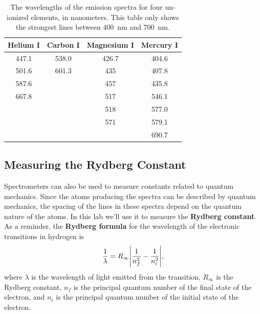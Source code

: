 \documentclass[]{manual}
\begin{document}
	\begin{table}[H]
		\centering
		\begin{tabular}{c|c|c|c}
			Helium I & Carbon I & Magnesium I & Mercury I \\
			\hline
			447.1 & 538.0 & 426.7 & 404.6 \\
			501.6 & 601.3 & 435   & 407.8 \\
			587.6 &       & 457   & 435.8 \\
			667.8 &       & 517   & 546.1 \\
                  &       & 518   & 577.0 \\
                  &       & 571   & 579.1 \\
                  &       &       & 690.7
		\end{tabular}
		\caption{
            The wavelengths of the emission spectra for four un-ionized elements, in nanometers.
		    This table only shows the strongest lines between \SI{400}{\nano\meter} and \SI{700}{\nano\meter}.
        }
		\label{table:emission-spectra}
	\end{table}


    \subsection{Measuring the Rydberg Constant}

    Spectrometers can also be used to measure constants related to quantum mechanics.
    Since the atoms producing the spectra can be described by quantum mechanics, the spacing of the lines in these spectra depend on the quantum nature of the atoms.
    In this lab we'll use it to measure the \textbf{Rydberg constant}.
    As a reminder, the \textbf{Rydberg formula} for the wavelength of the electronic transitions in hydrogen is
    \begin{align}
        \frac{1}{\lambda} = R_{\infty} \abs{\frac{1}{n_f^2}-\frac{1}{n_i^2}},
    \end{align}
    where $\lambda$ is the wavelength of light emitted from the transition, $R_{\infty}$ is the Rydberg constant, $n_f$ is the principal quantum number of the final state of the electron, and $n_i$ is the principal quantum number of the initial state of the electron.
\end{document}
